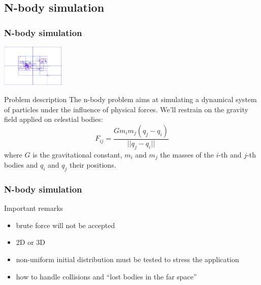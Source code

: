 \subsection{N-body simulation}
\begin{frame}[containsverbatim]
\frametitle{N-body simulation}
\begin{center}
\includegraphics[width=3.0cm]{Day2/images/nbody.png}
\end{center}
\begin{block}{Problem description}
The n-body problem aims at simulating a dynamical system of particles under the influence of physical forces. We'll restrain on the gravity field applied on celestial bodies:
$$
F_{ij} = \frac{G m_i m_j (q_j - q_i)}{||q_j - q_i||}
$$
where $G$ is the gravitational constant, $m_i$ and $m_j$ the masses of the $i$-th and $j$-th bodies and $q_i$ and $q_j$ their positions.
\end{block}
\end{frame}
\begin{frame}[containsverbatim]
\frametitle{N-body simulation}
\begin{block}{Important remarks}
\begin{itemize}
	\item{brute force will not be accepted}
	\item{2D or 3D}
	\item{non-uniform initial distribution must be tested to stress the application}
	\item{how to handle collisions and ``lost bodies in the far space''}
\end{itemize}
\end{block}
\end{frame}



